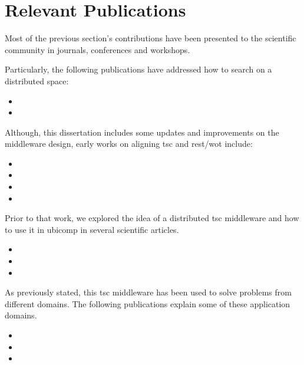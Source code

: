 \section{Relevant Publications}


Most of the previous section's contributions have been presented to the scientific community in journals, conferences and workshops.

\begin{sloppypar}

Particularly, the following publications have addressed how to search on a distributed space:
\begin{itemize}
 \item[] 
 \item[] 
\end{itemize}


Although, this dissertation includes some updates and improvements on the middleware design, early works on aligning \ac{tsc} and \ac{rest}/\ac{wot} include:
\begin{itemize}
 \item[] 
 \item[] 
 \item[] 
 \item[] 
\end{itemize}


Prior to that work, we explored the idea of a distributed \ac{tsc} middleware and how to use it in \ac{ubicomp} in several scientific articles. %
\begin{itemize}
 \item[] 
 \item[] 
 \item[] 
\end{itemize}


As previously stated, this \ac{tsc} middleware has been used to solve problems from different domains.
The following publications explain some of these application domains.
\begin{itemize}
 \item[] 
 \item[] 
 \item[] 
\end{itemize}



\end{sloppypar}
